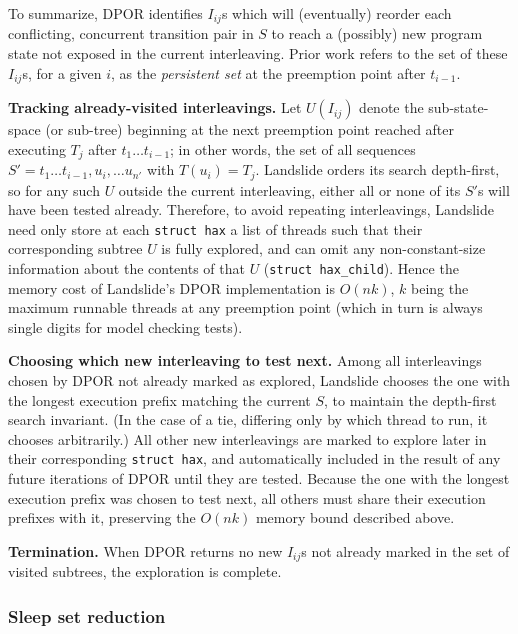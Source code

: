 To summarize, %
DPOR identifies $I_{ij}$s which will (eventually) reorder each conflicting, concurrent transition pair in $S$
to reach a (possibly) new program state not exposed in the current interleaving.
Prior work \cite{partial-order-methods,dpor,optimal-dpor} refers to the set of these $I_{ij}$s,
for a given $i$,
as the {\em persistent set} at the preemption point after $t_{i-1}$.

{\bf Tracking already-visited interleavings.}
Let $U(I_{ij})$ denote the sub-state-space (or sub-tree) beginning at the next preemption point reached
after executing $T_j$ after $t_1 \dots t_{i-1}$;
in other words, the set of all sequences $S' = t_1 \dots t_{i-1}, u_i, \dots u_{n'}$ with $T(u_i) = T_j$.
Landslide orders its search depth-first,
so for any such $U$ outside the current interleaving,
either all or none of its $S'$s will have been tested already.
Therefore, to avoid repeating interleavings,
Landslide need only store at each {\tt struct hax} a list of threads
such that their corresponding subtree $U$ is fully explored,
and can omit any non-constant-size information about the contents of that $U$
({\tt struct hax\_child}).
Hence the memory cost of Landslide's DPOR implementation is $O(nk)$,
$k$ being the maximum runnable threads at any preemption point
(which in turn is always single digits for model checking tests).

{\bf Choosing which new interleaving to test next.}
Among all interleavings chosen by DPOR not already marked as explored,
Landslide chooses the one with the longest execution prefix matching the current $S$,
to maintain the depth-first search invariant.
(In the case of a tie, differing only by which thread to run, it chooses arbitrarily.)
All other new interleavings are marked to explore later in their corresponding {\tt struct hax},
and automatically included in the result of any future iterations of DPOR until they are tested.
Because the one with the longest execution prefix was chosen to test next,
all others must share their execution prefixes with it,
preserving the $O(nk)$ memory bound described above.

{\bf Termination.}
When DPOR returns no new $I_{ij}$s not already marked in the set of visited subtrees,
the exploration is complete.

\subsubsection{Sleep set reduction}
\label{sec:landslide-sleepsets}

